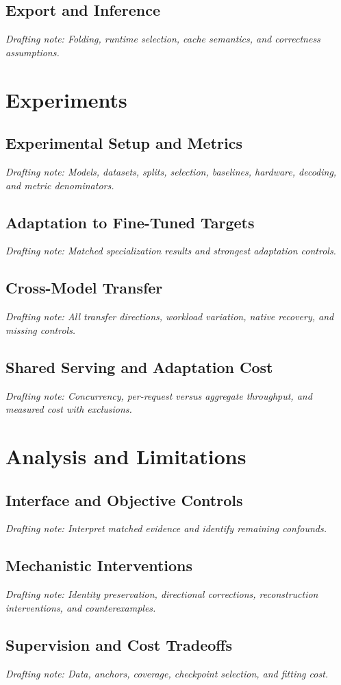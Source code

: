 \documentclass[letterpaper]{article}
\newcommand{\draftnote}[1]{\par\noindent\textit{Drafting note: #1}\par}
\begin{document}
\subsection{Export and Inference}
\draftnote{Folding, runtime selection, cache semantics, and correctness assumptions.}

\section{Experiments}
\label{sec:experiments}
\subsection{Experimental Setup and Metrics}
\draftnote{Models, datasets, splits, selection, baselines, hardware, decoding, and metric denominators.}
\subsection{Adaptation to Fine-Tuned Targets}
\draftnote{Matched specialization results and strongest adaptation controls.}
\subsection{Cross-Model Transfer}
\draftnote{All transfer directions, workload variation, native recovery, and missing controls.}
\subsection{Shared Serving and Adaptation Cost}
\draftnote{Concurrency, per-request versus aggregate throughput, and measured cost with exclusions.}

\section{Analysis and Limitations}
\label{sec:analysis}
\subsection{Interface and Objective Controls}
\draftnote{Interpret matched evidence and identify remaining confounds.}
\subsection{Mechanistic Interventions}
\draftnote{Identity preservation, directional corrections, reconstruction interventions, and counterexamples.}
\subsection{Supervision and Cost Tradeoffs}
\draftnote{Data, anchors, coverage, checkpoint selection, and fitting cost.}
\end{document}
